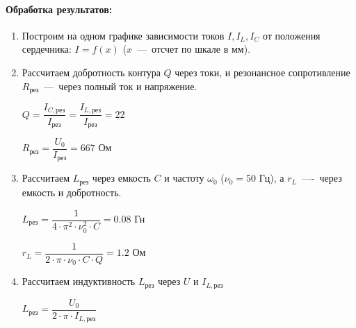 \documentclass[a4paper, 12pt]{article}
\newcommand{\parag}[1]{\paragraph*{#1:}}
\begin{document}
\newpage

\parag{Обработка результатов} 

\begin{enumerate}
    \item Построим на одном графике зависимости токов $I, I_L, I_C$ от положения сердечника: $I = f(x)$ ($x$~---~отсчет по шкале в мм).
    
    \item Рассчитаем добротность контура $Q$ через токи, и резонансное сопротивление $R_{рез}$~---~через полный ток и напряжение.
    
    $Q = \dfrac{I_{C, рез}}{I_{рез}} = \dfrac{I_{L, рез}}{I_{рез}} = 22$

    $R_{рез} = \dfrac{U_0}{I_{рез}} = 667$ Ом

    \item Рассчитаем $L_{рез}$ через емкость $C$ и частоту $\omega_0$ ($\nu_0 = 50$ Гц), а $r_L$~----~через емкость и добротность.
    
    $L_{рез} = \dfrac{1}{4 \cdot \pi^2 \cdot \nu_0^2 \cdot C} = 0.08$ Гн
    
    $r_L = \dfrac{1}{2 \cdot \pi \cdot \nu_0 \cdot C \cdot Q} = 1.2$ Ом

    \item Рассчитаем индуктивность $L_{рез}$ через $U$ и $I_{L, рез}$
    
    $L_{рез} = \dfrac{U_0}{2 \cdot \pi \cdot I_{L, рез}}$
\end{enumerate}
\end{document}
